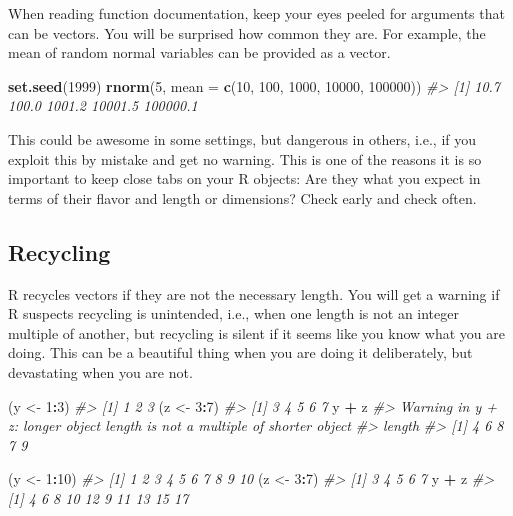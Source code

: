 \documentclass[]{book}
\newenvironment{Shaded}{\begin{snugshade}}{\end{snugshade}}
\newcommand{\KeywordTok}[1]{\textcolor[rgb]{0.13,0.29,0.53}{\textbf{#1}}}
\newcommand{\DataTypeTok}[1]{\textcolor[rgb]{0.13,0.29,0.53}{#1}}
\newcommand{\DecValTok}[1]{\textcolor[rgb]{0.00,0.00,0.81}{#1}}
\newcommand{\StringTok}[1]{\textcolor[rgb]{0.31,0.60,0.02}{#1}}
\newcommand{\CommentTok}[1]{\textcolor[rgb]{0.56,0.35,0.01}{\textit{#1}}}
\newcommand{\OperatorTok}[1]{\textcolor[rgb]{0.81,0.36,0.00}{\textbf{#1}}}
\newcommand{\NormalTok}[1]{#1}
\begin{document}
When reading function documentation, keep your eyes peeled for arguments
that can be vectors. You will be surprised how common they are. For
example, the mean of random normal variables can be provided as a
vector.

\begin{Shaded}
\begin{Highlighting}[]
\KeywordTok{set.seed}\NormalTok{(}\DecValTok{1999}\NormalTok{)}
\KeywordTok{rnorm}\NormalTok{(}\DecValTok{5}\NormalTok{, }\DataTypeTok{mean =} \KeywordTok{c}\NormalTok{(}\DecValTok{10}\NormalTok{, }\DecValTok{100}\NormalTok{, }\DecValTok{1000}\NormalTok{, }\DecValTok{10000}\NormalTok{, }\DecValTok{100000}\NormalTok{))}
\CommentTok{#> [1]     10.7    100.0   1001.2  10001.5 100000.1}
\end{Highlighting}
\end{Shaded}

This could be awesome in some settings, but dangerous in others, i.e.,
if you exploit this by mistake and get no warning. This is one of the
reasons it is so important to keep close tabs on your R objects: Are
they what you expect in terms of their flavor and length or dimensions?
Check early and check often.

\subsection{Recycling}\label{recycling}

R recycles vectors if they are not the necessary length. You will get a
warning if R suspects recycling is unintended, i.e., when one length is
not an integer multiple of another, but recycling is silent if it seems
like you know what you are doing. This can be a beautiful thing when you
are doing it deliberately, but devastating when you are not.

\begin{Shaded}
\begin{Highlighting}[]
\NormalTok{(y <-}\StringTok{ }\DecValTok{1}\OperatorTok{:}\DecValTok{3}\NormalTok{)}
\CommentTok{#> [1] 1 2 3}
\NormalTok{(z <-}\StringTok{ }\DecValTok{3}\OperatorTok{:}\DecValTok{7}\NormalTok{)}
\CommentTok{#> [1] 3 4 5 6 7}
\NormalTok{y }\OperatorTok{+}\StringTok{ }\NormalTok{z}
\CommentTok{#> Warning in y + z: longer object length is not a multiple of shorter object}
\CommentTok{#> length}
\CommentTok{#> [1] 4 6 8 7 9}

\NormalTok{(y <-}\StringTok{ }\DecValTok{1}\OperatorTok{:}\DecValTok{10}\NormalTok{)}
\CommentTok{#>  [1]  1  2  3  4  5  6  7  8  9 10}
\NormalTok{(z <-}\StringTok{ }\DecValTok{3}\OperatorTok{:}\DecValTok{7}\NormalTok{)}
\CommentTok{#> [1] 3 4 5 6 7}
\NormalTok{y }\OperatorTok{+}\StringTok{ }\NormalTok{z}
\CommentTok{#>  [1]  4  6  8 10 12  9 11 13 15 17}
\end{Highlighting}
\end{Shaded}
\end{document}
